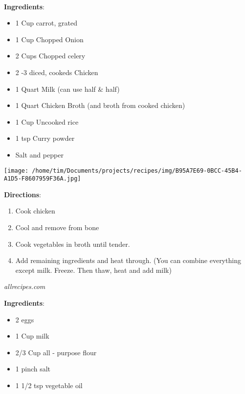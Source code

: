 \documentclass[11pt, twoside, openany]{book}
\begin{document}
 \label{mulligatawny-soup}\hfill\textit{}\\
\begin{minipage}[t]{0.8\linewidth}
\textbf{Ingredients}:\vspace{-3mm}
\begin{multicols}{2}
\begin{itemize}\setlength\itemsep{-1mm}
\item 1 Cup carrot, grated
\item 1 Cup Chopped Onion
\item 2 Cups Chopped celery
\item 2 -3 diced, cookeds Chicken
\item 1 Quart Milk (can use half & half)
\item 1 Quart Chicken Broth (and broth from cooked chicken)
\item 1 Cup Uncooked rice
\item 1 tsp Curry powder
\item Salt and pepper
\end{itemize}
\end{multicols}
\end{minipage}
\begin{minipage}[t]{0.2\linewidth}
\centering \strut\vspace*{-\baselineskip}\newline
\texttt{[image: /home/tim/Documents/projects/recipes/img/B95A7E69-0BCC-45B4-A1D5-F8607959F36A.jpg]}\\
\end{minipage}\vspace{3mm}
\textbf{Directions}:
\vspace{-3mm}\begin{enumerate}\setlength\itemsep{-1mm}
\item Cook chicken
\item Cool and remove from bone
\item Cook vegetables in broth until tender.
\item Add remaining ingredients and heat through. (You can combine everything except milk. Freeze. Then thaw, heat and add milk)
\end{enumerate}
 \label{crepes}\hfill\textit{allrecipes.com}\\
\begin{minipage}[t]{0.8\linewidth}
\textbf{Ingredients}:\vspace{-3mm}
\begin{multicols}{2}
\begin{itemize}\setlength\itemsep{-1mm}
\item 2 eggs
\item 1 Cup milk
\item 2/3 Cup all - purpose flour
\item 1 pinch salt
\item 1 1/2 tsp vegetable oil
\end{itemize}
\end{multicols}
\end{minipage}
\end{document}
